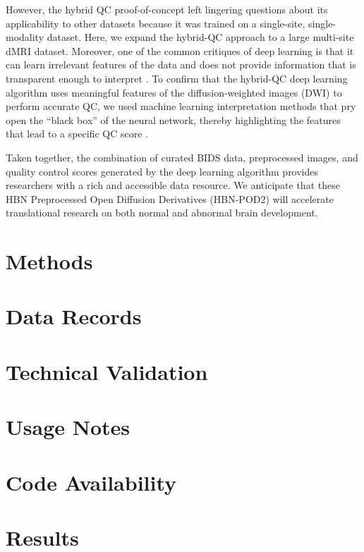 \documentclass[fleqn,10pt,inline]{wlscirep}
\begin{document}
However, the hybrid QC proof-of-concept left lingering questions about its
applicability to other datasets because it was trained on a single-site,
single-modality dataset. Here, we expand the hybrid-QC approach to a large
multi-site dMRI dataset. Moreover, one of the common critiques of deep
learning is that it can learn irrelevant features of the data and does not
provide information that is transparent enough to interpret
\cite{lipton2017doctor, salahuddin2022transparency, Zech2018-ki}. To confirm
that the hybrid-QC deep learning algorithm uses meaningful features of the
diffusion-weighted images (DWI) to perform accurate QC, we used machine learning
interpretation methods that pry open the ``black box'' of the neural network, thereby
highlighting the features that lead to a specific QC score
\cite{sundararajan2017axiomatic, murdoch2019definitions}.

Taken together, the combination of curated BIDS data, preprocessed images, and quality control scores generated by the deep learning algorithm provides researchers with a rich and accessible data resource. We anticipate that these HBN Preprocessed Open Diffusion Derivatives (HBN-POD2) will accelerate translational research on both normal and abnormal brain development.

\section*{Methods}

\section*{Data Records}

\section*{Technical Validation}

\section*{Usage Notes}

\section*{Code Availability}


\section*{Results}
\end{document}
